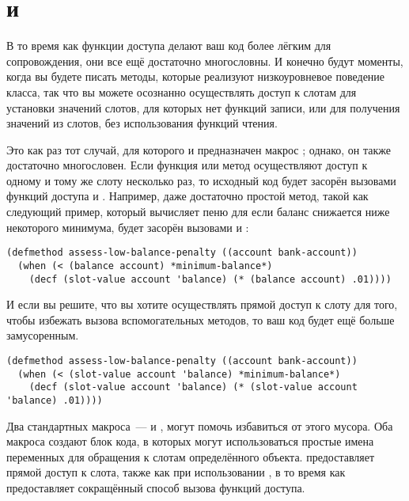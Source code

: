 \section{ и }

В то время как функции доступа делают ваш код более лёгким для сопровождения, они все ещё
достаточно многословны.  И конечно будут моменты, когда вы будете писать методы, которые
реализуют низкоуровневое поведение класса, так что вы можете осознанно осуществлять доступ
к слотам для установки значений слотов, для которых нет функций записи, или для получения
значений из слотов, без использования функций чтения.

Это как раз тот случай, для которого и предназначен макрос ; однако, он
также достаточно многословен.  Если функция или метод осуществляют доступ к одному и тому
же слоту несколько раз, то исходный код будет засорён вызовами функций доступа и
.  Например, даже достаточно простой метод, такой как следующий пример,
который вычисляет пеню для  если баланс снижается ниже некоторого
минимума, будет засорён вызовами  и :

\begin{lstlisting}
(defmethod assess-low-balance-penalty ((account bank-account))
  (when (< (balance account) *minimum-balance*)
    (decf (slot-value account 'balance) (* (balance account) .01))))
\end{lstlisting}

И если вы решите, что вы хотите осуществлять прямой доступ к слоту для того, чтобы
избежать вызова вспомогательных методов, то ваш код будет ещё больше замусоренным.

\begin{lstlisting}
(defmethod assess-low-balance-penalty ((account bank-account))
  (when (< (slot-value account 'balance) *minimum-balance*)
    (decf (slot-value account 'balance) (* (slot-value account 'balance) .01))))
\end{lstlisting}

Два стандартных макроса~---  и , могут помочь
избавиться от этого мусора.  Оба макроса создают блок кода, в которых могут использоваться
простые имена переменных для обращения к слотам определённого объекта.  
предоставляет прямой доступ к слота, также как при использовании , в то
время как  предоставляет сокращённый способ вызова функций доступа.

